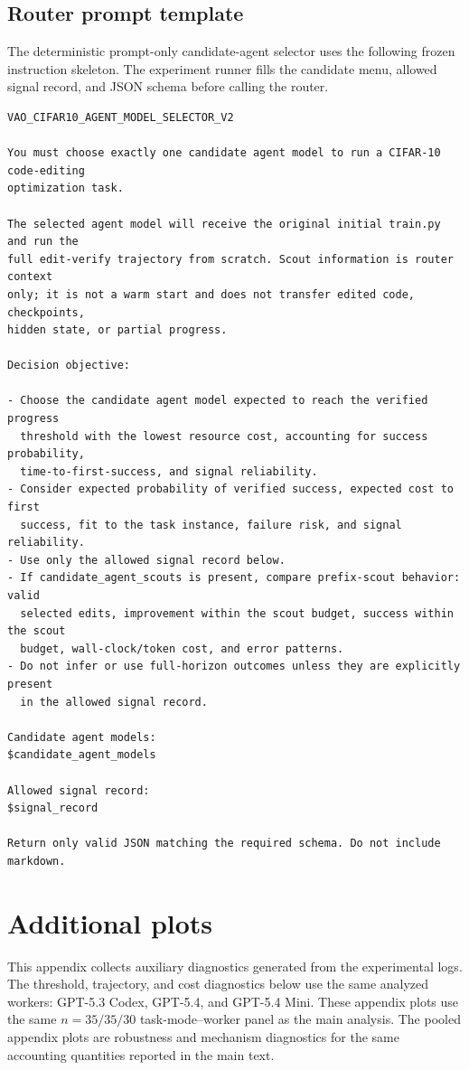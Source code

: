 \documentclass{article}
\begin{document}
\subsection{Router prompt template}
\label{app:router-prompt}

The deterministic prompt-only candidate-agent selector uses the following frozen
instruction skeleton. The experiment runner fills the candidate menu, allowed
signal record, and JSON schema before calling the router.

\begingroup
\footnotesize
\begin{verbatim}
VAO_CIFAR10_AGENT_MODEL_SELECTOR_V2

You must choose exactly one candidate agent model to run a CIFAR-10 code-editing
optimization task.

The selected agent model will receive the original initial train.py and run the
full edit-verify trajectory from scratch. Scout information is router context
only; it is not a warm start and does not transfer edited code, checkpoints,
hidden state, or partial progress.

Decision objective:

- Choose the candidate agent model expected to reach the verified progress
  threshold with the lowest resource cost, accounting for success probability,
  time-to-first-success, and signal reliability.
- Consider expected probability of verified success, expected cost to first
  success, fit to the task instance, failure risk, and signal reliability.
- Use only the allowed signal record below.
- If candidate_agent_scouts is present, compare prefix-scout behavior: valid
  selected edits, improvement within the scout budget, success within the scout
  budget, wall-clock/token cost, and error patterns.
- Do not infer or use full-horizon outcomes unless they are explicitly present
  in the allowed signal record.

Candidate agent models:
$candidate_agent_models

Allowed signal record:
$signal_record

Return only valid JSON matching the required schema. Do not include markdown.
\end{verbatim}
\endgroup

\section{Additional plots}
\label{app:diagnostic-plots}

This appendix collects auxiliary diagnostics generated from the experimental logs.
The threshold, trajectory, and cost diagnostics below use the same analyzed workers: GPT-5.3 Codex, GPT-5.4, and GPT-5.4 Mini.
These appendix plots use the same \(n=35/35/30\) task-mode--worker panel as the main analysis.
The pooled appendix plots are robustness and mechanism diagnostics for the same accounting quantities reported in the main text.
\end{document}
